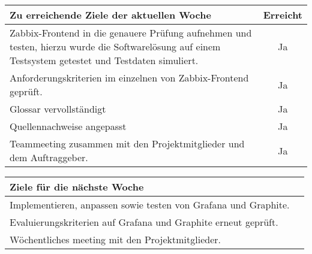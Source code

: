 \begin{tabularx}{\textwidth}{Xc}
    \arrayrulecolor{OliveGreen}
    \toprule
    {\bfseries Zu erreichende Ziele der aktuellen Woche} & {\bfseries Erreicht} \\
    \midrule[2pt]
    Zabbix\hyp{}Frontend in die genauere Prüfung aufnehmen und testen, hierzu
    wurde die Softwarelösung auf einem Testsystem getestet und Testdaten
    simuliert. &Ja              \\
    \rowcolor{OliveGreen!15}
    Anforderungskriterien im einzelnen von Zabbix\hyp{}Frontend geprüft. &Ja \\
    \rowcolor{White}
    Glossar vervollständigt                                 &Ja              \\
    \rowcolor{OliveGreen!15}
    Quellennachweise angepasst                              &Ja              \\
    \rowcolor{White}
    Teammeeting zusammen mit den Projektmitglieder und dem Auftraggeber.&Ja   \\
    \bottomrule[2pt]
\end{tabularx}
%
\vspace{1cm}
%
\begin{tabularx}{\textwidth}{Xc}
    \arrayrulecolor{OliveGreen}
    \toprule
    {\bfseries Ziele für die nächste Woche}        &                         \\
    \midrule[2pt]
    Implementieren, anpassen sowie testen von Grafana und Graphite.  &        \\
    \rowcolor{OliveGreen!15}
    Evaluierungskriterien auf Grafana und Graphite erneut geprüft.   &        \\
    \rowcolor{White}
    Wöchentliches meeting mit den Projektmitglieder.    &                    \\
\end{tabularx}
